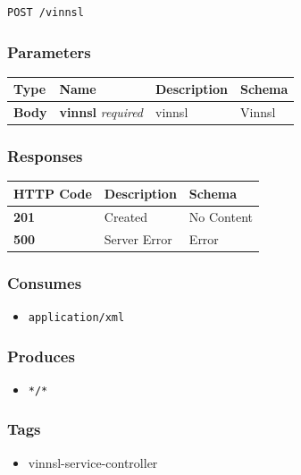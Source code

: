 \begin{verbatim}
POST /vinnsl
\end{verbatim}

\subsubsection{Parameters}\label{parameters-1}

\begin{longtable}[]{@{}llll@{}}
\toprule
Type & Name & Description & Schema\tabularnewline
\midrule
\endhead
\textbf{Body} & \textbf{vinnsl} \emph{required} & vinnsl &
Vinnsl\tabularnewline
\bottomrule
\end{longtable}

\subsubsection{Responses}\label{responses}

\begin{longtable}[]{@{}lll@{}}
\toprule
HTTP Code & Description & Schema\tabularnewline
\midrule
\endhead
\textbf{201} & Created & No Content\tabularnewline
\textbf{500} & Server Error & Error\tabularnewline
\bottomrule
\end{longtable}

\subsubsection{Consumes}\label{consumes}

\begin{itemize}
\tightlist
\item
  \texttt{application/xml}
\end{itemize}

\subsubsection{Produces}\label{produces}

\begin{itemize}
\tightlist
\item
  \texttt{*/*}
\end{itemize}

\subsubsection{Tags}\label{tags}

\begin{itemize}
\tightlist
\item
  vinnsl-service-controller
\end{itemize}

